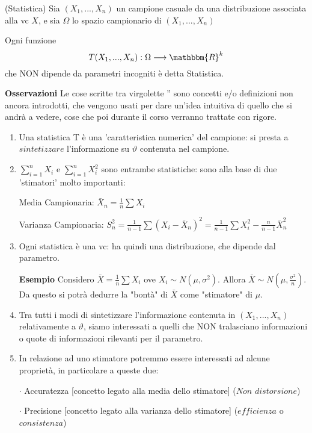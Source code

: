 \begin{definizione} (Statistica)
Sia $(X_1,...,X_n)$ un campione casuale da una distribuzione associata alla vc $X$, e sia $\Omega$ lo spazio campionario di $(X_1,...,X_n)$

\noindent Ogni funzione $$T(X_1,...,X_n):\Omega \longrightarrow \mathbbm{R}^k$$ che NON dipende da parametri incogniti è detta Statistica.
\end{definizione}

\textbf{Osservazioni}
Le cose scritte tra virgolette '' sono concetti e/o definizioni non ancora introdotti, che vengono usati per dare un'idea intuitiva di quello che si andrà a vedere, cose che poi durante il corso verranno trattate con rigore.
\begin{enumerate}
\item Una statistica T è una 'caratteristica numerica' del campione: si presta a $sintetizzare$ l'informazione su $\vartheta$ contenuta nel campione.
\item $\sum_{i=1}^n X_i$ e $\sum_{i=1}^n X_i^2$ sono entrambe statistiche: sono alla base di due 'stimatori' molto importanti:

Media Campionaria: $\bar{X}_n =\frac{1}{n}\sum X_i$

Varianza Campionaria: $S_n^2=\frac{1}{n-1} \sum (X_i-\bar{X}_n)^2 = \frac{1}{n-1} \sum X_i^2 - \frac{n}{n-1}\bar{X}_n^2$
\item Ogni statistica è una vc: ha quindi una distribuzione, che dipende dal parametro.

\textbf{Esempio} Considero $\bar{X}=\frac{1}{n} \sum X_i$ ove $X_i \sim N(\mu,\sigma^2)$. Allora $\bar{X} \sim N(\mu,\frac{\sigma^2}{n})$. Da questo si potrà dedurre la "bontà" di $\bar{X}$ come "stimatore" di $\mu$.
\item Tra tutti i modi di sintetizzare l'informazione contenuta in $(X_1,...,X_n)$ relativamente a $\vartheta$, siamo interessati a quelli che NON tralasciano informazioni o quote di informazioni rilevanti per il parametro.
\item In relazione ad uno stimatore potremmo essere interessati ad alcune proprietà, in particolare a queste due:

$\cdot$ Accuratezza [concetto legato alla media dello stimatore] ($Non$ $distorsione$)

$\cdot$ Precisione [concetto legato alla varianza dello stimatore] ($efficienza$ o $consistenza$)
\end{enumerate}
